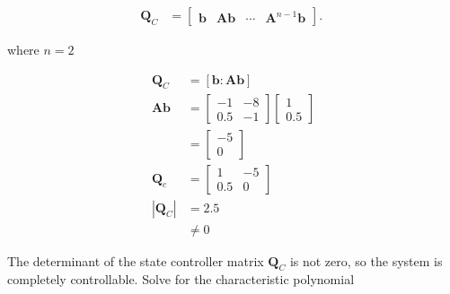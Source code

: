 \documentclass[main.tex]{subfiles}
\begin{document}
\begin{enumerate}
\begin{enumerate}
        $$
        \begin{aligned}
        \textbf{Q}_C &= \left[\begin{array}{llll}
        \textbf{b} & \textbf{A}\textbf{b} & \cdots &  \textbf{A}^{n-1} \textbf{b}
        \end{array}\right] \text {. }
        \end{aligned}
        $$

        where $n=2$

        $$
        \begin{aligned}
        \textbf{Q}_C &= [\textbf{b} : \textbf{A}\textbf{b}] \\
        \textbf{A} \textbf{b} &= \left[\begin{array}{cc}
        -1 & -8 \\
        0.5 & -1
        \end{array}\right]\left[\begin{array}{l}
        1 \\
        0.5
        \end{array}\right] \\
        & =\left[\begin{array}{c}
        -5 \\
        0
        \end{array}\right] \\
        \textbf{Q}_c &= \left[\begin{array}{cc}
        1 & -5 \\
        0.5 & 0
        \end{array}\right] \\
        |\textbf{Q}_C| &= 2.5\\
        & \neq 0
        \end{aligned}
        $$

        The determinant of the state controller matrix $\textbf{Q}_C$ is not zero, so the system is completely controllable. Solve for the characteristic polynomial 


\end{enumerate}
\end{enumerate}
\end{document}
